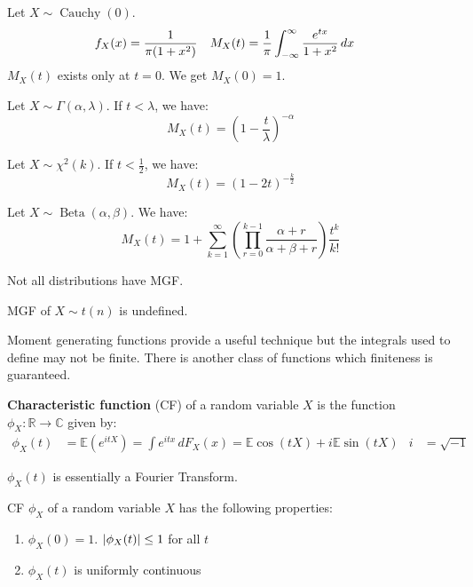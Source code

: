 \documentclass{huhtakm-template-book}
\newcommand{\expect}{\mathbb{E}}
\DeclareMathOperator{\Cauchy}{Cauchy}
\DeclareMathOperator{\Beta}{Beta}
\begin{document}
\begin{eg}
	Let $X\sim\Cauchy(0)$.
	\begin{align*}
		f_{X}(x)&=\frac{1}{\pi(1+x^{2})} & M_{X}(t)&=\frac{1}{\pi}\int_{-\infty}^{\infty}\frac{e^{tx}}{1+x^{2}}\,dx
	\end{align*}
	$M_{X}(t)$ exists only at $t=0$. We get $M_{X}(0)=1$.
\end{eg}
\begin{eg}
	Let $X\sim\Gamma(\alpha,\lambda)$. If $t<\lambda$, we have:
	\begin{equation*}
		M_{X}(t)=\left(1-\frac{t}{\lambda}\right)^{-\alpha}
	\end{equation*}
\end{eg}
\begin{eg}
	Let $X\sim\chi^{2}(k)$. If $t<\frac{1}{2}$, we have:
	\begin{equation*}
		M_{X}(t)=(1-2t)^{-\frac{k}{2}}
	\end{equation*}
\end{eg}
\begin{eg}
	Let $X\sim\Beta(\alpha,\beta)$. We have:
	\begin{equation*}
		M_{X}(t)=1+\sum_{k=1}^{\infty}\left(\prod_{r=0}^{k-1}\frac{\alpha+r}{\alpha+\beta+r}\right)\frac{t^{k}}{k!}
	\end{equation*}
\end{eg}
\begin{rem}
	Not all distributions have MGF.
\end{rem}
\begin{eg}
	MGF of $X\sim t(n)$ is undefined.
\end{eg}
Moment generating functions provide a useful technique but the integrals used to define may not be finite. There is another class of functions which finiteness is guaranteed.
\begin{defn}
	\textbf{Characteristic function} (CF) of a random variable $X$ is the function $\phi_{X}:\mathbb{R}\to\mathbb{C}$ given by:
	\begin{align*}
		\phi_{X}(t)&=\expect(e^{itX})=\int e^{itx}\,dF_{X}(x)=\expect\cos(tX)+i\expect\sin(tX) & i&=\sqrt{-1}
	\end{align*}
\end{defn}
\begin{rem}
	$\phi_{X}(t)$ is essentially a Fourier Transform.
\end{rem}
\begin{lem}
	CF $\phi_{X}$ of a random variable $X$ has the following properties:
	\begin{enumerate}
		\item $\phi_{X}(0)=1$. $\left|{\phi_{X}(t)}\right|\leq 1$ for all $t$
		\item $\phi_{X}(t)$ is uniformly continuous
	\end{enumerate}
\end{lem}
\end{document}
